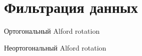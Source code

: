 \documentclass[a4paper,11pt]{article}
\begin{document}
%
%

%


%

\appendix
\section{Фильтрация данных}

\begin{minipage}[c]{0.47\linewidth}	
\begin{center}
		Ортогональный Alford rotation \\
	  		\label{fig:rot4_scheme}
\end{center}	  		
\end{minipage} \hfill
\begin{minipage}[c]{0.47\linewidth}
\begin{center}
		Неортогональный Alford rotation\\
			\label{fig:rot4_gs_scheme}
\end{center}
\end{minipage} 	\\

\end{document}
